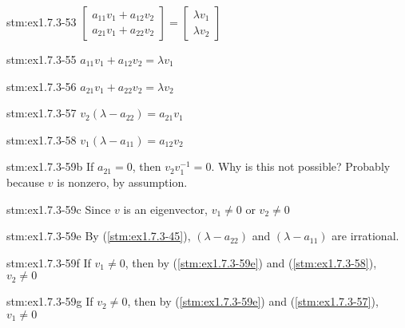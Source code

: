 \begin{statement}{stm:ex1.7.3-53}
$\begin{bmatrix} a_{11}v_1 + a_{12}v_2 \\ a_{21}v_1 + a_{22}v_2 \end{bmatrix} = \begin{bmatrix} \lambda v_1 \\ \lambda v_2 \end{bmatrix}$
\end{statement}

\begin{statement}{stm:ex1.7.3-55}
$a_{11}v_1 + a_{12}v_2 = \lambda v_1$
\end{statement}

\begin{statement}{stm:ex1.7.3-56}
$a_{21}v_1 + a_{22}v_2 = \lambda v_2$
\end{statement}

\begin{statement}{stm:ex1.7.3-57}
$v_2(\lambda - a_{22}) = a_{21}v_1$
\end{statement}

\begin{statement}{stm:ex1.7.3-58}
$v_1(\lambda - a_{11}) = a_{12}v_2$
\end{statement}

\begin{explanation}{stm:ex1.7.3-59b}
If $a_{21} = 0$, then $v_2 v_1^{-1} = 0$. Why is this not possible? Probably because $v$ is nonzero, by assumption.
\end{explanation}

\begin{statement}{stm:ex1.7.3-59c}
Since $v$ is an eigenvector, $v_1 \ne 0$ or $v_2 \ne 0$
\end{statement}

\begin{statement}{stm:ex1.7.3-59e}
By (\ref{stm:ex1.7.3-45}), $(\lambda - a_{22})$ and $(\lambda - a_{11})$ are irrational.
\end{statement}

\begin{statement}{stm:ex1.7.3-59f}
If $v_1 \ne 0$, then by (\ref{stm:ex1.7.3-59e}) and (\ref{stm:ex1.7.3-58}), $v_2 \ne 0$
\end{statement}

\begin{statement}{stm:ex1.7.3-59g}
If $v_2 \ne 0$, then by (\ref{stm:ex1.7.3-59e}) and (\ref{stm:ex1.7.3-57}), $v_1 \ne 0$
\end{statement}

